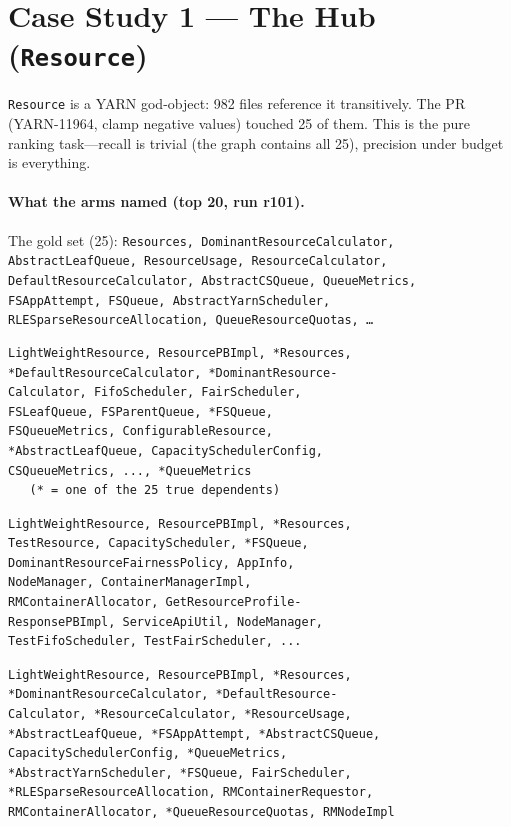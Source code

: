 \documentclass[11pt,twocolumn]{article}
\begin{document}
\section{Case Study 1 --- The Hub (\texttt{Resource})}

\texttt{Resource} is a YARN god-object: 982 files reference it transitively. The PR
(YARN-11964, clamp negative values) touched 25 of them. This is the pure ranking task---recall is
trivial (the graph contains all 25), precision under budget is everything.

\paragraph{What the arms named (top 20, run r101).}
The gold set (25): {\scriptsize\texttt{Resources, DominantResourceCalculator, AbstractLeafQueue,
ResourceUsage, ResourceCalculator, DefaultResourceCalculator, AbstractCSQueue, QueueMetrics,
FSAppAttempt, FSQueue, AbstractYarnScheduler, RLESparseResourceAllocation, QueueResourceQuotas,
\ldots}}

\begin{Verbatim}[label={Plain (control) -- 74 files; 6/25 gold in top 20}]
LightWeightResource, ResourcePBImpl, *Resources,
*DefaultResourceCalculator, *DominantResource-
Calculator, FifoScheduler, FairScheduler,
FSLeafQueue, FSParentQueue, *FSQueue,
FSQueueMetrics, ConfigurableResource,
*AbstractLeafQueue, CapacitySchedulerConfig,
CSQueueMetrics, ..., *QueueMetrics
   (* = one of the 25 true dependents)
\end{Verbatim}

\begin{Verbatim}[label={Graph-MCP -- 26 files; only 2/25 gold in top 20}]
LightWeightResource, ResourcePBImpl, *Resources,
TestResource, CapacityScheduler, *FSQueue,
DominantResourceFairnessPolicy, AppInfo,
NodeManager, ContainerManagerImpl,
RMContainerAllocator, GetResourceProfile-
ResponsePBImpl, ServiceApiUtil, NodeManager,
TestFifoScheduler, TestFairScheduler, ...
\end{Verbatim}

\begin{Verbatim}[label={GraphNative -- 35 files; 13/25 gold in top 20}]
LightWeightResource, ResourcePBImpl, *Resources,
*DominantResourceCalculator, *DefaultResource-
Calculator, *ResourceCalculator, *ResourceUsage,
*AbstractLeafQueue, *FSAppAttempt, *AbstractCSQueue,
CapacitySchedulerConfig, *QueueMetrics,
*AbstractYarnScheduler, *FSQueue, FairScheduler,
*RLESparseResourceAllocation, RMContainerRequestor,
RMContainerAllocator, *QueueResourceQuotas, RMNodeImpl
\end{Verbatim}
\end{document}
